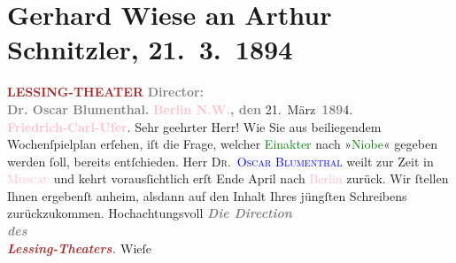 

               \section[Gerhard Wiese an Arthur Schnitzler, 21. 3. 1894]{ Gerhard Wiese an Arthur Schnitzler, 21. 3. 1894}\nopagebreak{}\rehead{ }\normalsize\beginnumbering{} \toendnotes[C]{\smallbreak\pagebreak[2]} 
\toendnotes[C]{\smallbreak}\pstart
           \noindent{}\centering{}{\pb}\textcolor{gray}{\textbf{\textcolor{brown}{LESSING-THEATER}{}\ledrightnote{\textcolor{brown}{Lessing-Theater}}}}\pend
           \pstart
           \noindent{}\centering{}\textcolor{gray}{\textbf{Director:}}{\\}\textcolor{gray}{\textbf{Dr. Oscar Blumenthal.}}\pend
           \pstart
           \noindent{}\raggedleft{}\textcolor{gray}{\textbf{\textcolor{pink}{Berlin N.W.}{}\ledrightnote{\textcolor{pink}{Berlin}}, den}}{ }21. März \textcolor{gray}{\textbf{189}}4.{\\}\textcolor{gray}{\textbf{\textcolor{pink}{Friedrich-Carl-Ufer}{}\ledrightnote{\textcolor{pink}{Kapelle-Ufer}}}}.\pend
           \pstart\center{}Sehr geehrter Herr!\pend\pstart
           Wie Sie aus beiliegendem Wochenſpielplan erſehen, iſt die Frage, welcher \textcolor{green}{Einakter}{} nach »\textcolor{green}{Niobe}{}\ledrightnote{\textcolor{green}{Niobe}}« gegeben werden ſoll, bereits
                    entſchieden. Herr \textsc{Dr. \textcolor{blue}{Oscar
                            Blumenthal}{}\ledrightnote{\textcolor{blue}{Oskar Blumenthal}}} weilt zur Zeit in \textsc{\textcolor{pink}{Moscau}{}\ledrightnote{\textcolor{pink}{Moskau}}} und kehrt vorausſichtlich erſt Ende April nach \textcolor{pink}{Berlin}{}\ledrightnote{\textcolor{pink}{Berlin}} zurück. Wir ſtellen Ihnen ergebenſt anheim, alsdann
                    auf den Inhalt Ihres jüngſten Schreibens zurückzukommen.\pend
           \pstart
           Hochachtungsvoll\pend
           \pstart
           \raggedleft{}\textcolor{gray}{\textbf{\textit{Die Direction}}}{\\}\textcolor{gray}{\textbf{\textit{des}}}{\\}\textcolor{gray}{\textbf{\textit{\textcolor{brown}{Lessing-Theaters}{}\ledrightnote{\textcolor{brown}{Lessing-Theater}}.}}}\pend
           \pstart \spacefill\mbox{Wieſe}\pend{}\endnumbering{}  
      